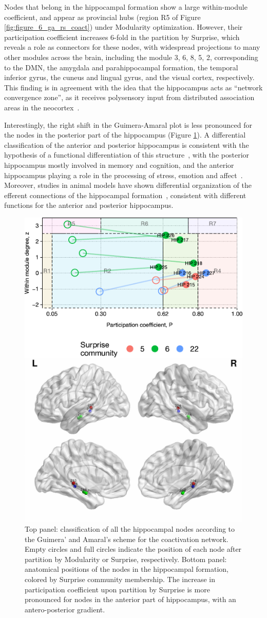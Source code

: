 Nodes that belong in the hippocampal formation show a large within-module coefficient, and appear as provincial hubs (region R5 of Figure \ref{fig:figure_6_ga_rs_coact}) under Modularity optimization. However, their participation coefficient increases 6-fold in the partition by Surprise, which reveals a role as connectors for these nodes, with widespread projections to many other modules across the brain, including the module 3, 6, 8, 5, 2, corresponding to the DMN, the amygdala and parahippocampal formation, the temporal inferior gyrus, the cuneus and lingual gyrus, and the visual cortex, respectively.
This finding is in agreement with the idea that the hippocampus acts as ``network convergence zone'', as it receives polysensory input from distributed association areas in the neocortex~\cite{misic2014}.

Interestingly, the right shift in the Guimera-Amaral plot is less pronounced for the nodes in the posterior part of the hippocampus (Figure \ref{fig:figure_7_ga_coact_hippocampus}). A differential classification of the anterior and posterior hippocampus is consistent with the hypothesis of a functional differentiation of this structure~\cite{moser1998}, with the posterior hippocampus mostly involved in memory and cognition, and the anterior hippocampus playing a role in the processing of stress, emotion and affect~\cite{fanselow2010}. Moreover, studies in animal models have shown differential organization of the efferent connections of the hippocampal formation~\cite{swanson1977}, consistent with different functions for the anterior and posterior hippocampus.

\begin{figure}[htb!]
\centering
\includegraphics[width=0.5\linewidth]{images/figure_7_hippocampus.pdf}
\caption{Top panel: classification of all the hippocampal nodes according to the Guimera' and Amaral's scheme for the coactivation network. Empty circles and full circles indicate the position of each node after partition by Modularity or Surprise, respectively. Bottom panel: anatomical positions of the nodes in the hippocampal formation, colored by Surprise community membership. The increase in participation coefficient upon partition by Surprise is more pronounced for nodes in the anterior part of hippocampus, with an antero-posterior gradient.}
\label{fig:figure_7_ga_coact_hippocampus}
\end{figure}

